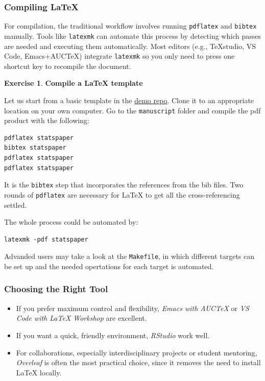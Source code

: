 \documentclass[
]{book}
\theoremstyle{definition}
\theoremstyle{definition}
\theoremstyle{definition}
\newtheorem{exercise}{Exercise}[chapter]
\theoremstyle{definition}
\theoremstyle{remark}
\begin{document}
\subsubsection{Compiling LaTeX}\label{compiling-latex}

For compilation, the traditional workflow involves running \texttt{pdflatex} and
\texttt{bibtex} manually. Tools like \texttt{latexmk} can automate this process by detecting
which passes are needed and executing them automatically. Most editors (e.g.,
TeXstudio, VS Code, Emacs+AUCTeX) integrate \texttt{latexmk} so you only need to press
one shortcut key to recompile the document.

\begin{exercise}
\textbf{Compile a LaTeX template}

Let us start from a basic template in the
\href{https://github.com/jun-yan/writing-demo}{demo repo}. Clone it to an appropriate
location on your own computer. Go to the \texttt{manuscript} folder and compile the pdf
product with the following:

\begin{verbatim}
pdflatex statspaper
bibtex statspaper
pdflatex statspaper
pdflatex statspaper
\end{verbatim}

It is the \texttt{bibtex} step that incorporates the references from the bib files. Two
rounds of \texttt{pdflatex} are necessary for LaTeX to get all the cross-referencing
settled.

The whole process could be automated by:

\begin{verbatim}
latexmk -pdf statspaper
\end{verbatim}

Advanded users may take a look at the \texttt{Makefile}, in which different targets can
be set up and the needed opertations for each target is automated.
\end{exercise}

\subsubsection{Choosing the Right Tool}\label{choosing-the-right-tool}

\begin{itemize}
\item
  If you prefer maximum control and flexibility, \emph{Emacs with AUCTeX} or \emph{VS
  Code with LaTeX Workshop} are excellent.
\item
  If you want a quick, friendly environment, \emph{RStudio} work well.
\item
  For collaborations, especially interdisciplinary projects or student
  mentoring, \emph{Overleaf} is often the most practical choice, since it removes
  the need to install LaTeX locally.
\end{itemize}
\end{document}
